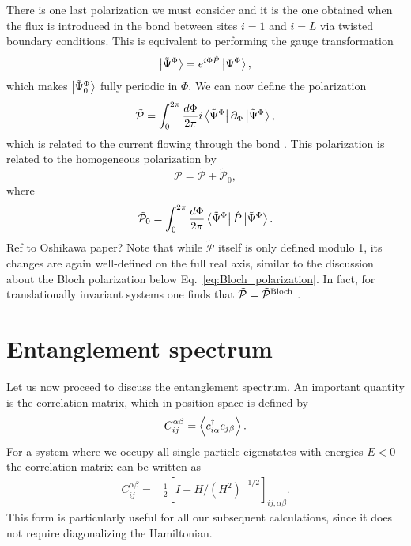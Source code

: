 \documentclass[twocolumn,amsmath,longbibliography,amssymb,superscriptaddress]{revtex4-1}
\newcommand{\maria}[1]{{\color{blue} #1}}
\begin{document}
There is one last polarization we must consider and it is the one obtained when the flux is introduced in the bond between sites $i=1$ and $i=L$ via twisted boundary conditions. This is equivalent to performing the gauge transformation
\begin{align}\label{eq:Psi_tilde}
\ket{\tilde{\Psi}^\Phi}=e^{i\Phi \hat{P}}\ket{\Psi^\Phi},
\end{align}
which makes $\ket{\tilde{\Psi}_0^\Phi}$ fully periodic in $\Phi$. We can now define the polarization
\begin{equation}
\tilde{\mathcal{P}} = \int_0^{2\pi}\frac{d\Phi}{2\pi} i\bra{\tilde{\Psi}^\Phi}\partial_\Phi \ket{\tilde{\Psi}^\Phi},
\label{eq:p_tilde}
\end{equation}
which is related to the current flowing through the bond \cite{Watanabe2018}. This polarization is related to the homogeneous polarization by 
\begin{equation}
\mathcal{P}= \tilde{\mathcal{P}}+\tilde{\mathcal{P}}_0,
\end{equation} 
where
\begin{equation}
\tilde {\mathcal{P}}_0= \int_0^{2\pi}\frac{d\Phi}{2\pi} \bra{\tilde{\Psi}^\Phi}\hat{P}\ket{\tilde{\Psi}^\Phi}.
\end{equation} 
\maria{Ref to Oshikawa paper?}
Note that while $\tilde{\mathcal{P}}$ itself is only defined modulo 1, its changes are again well-defined on the full real axis, similar to the discussion about the Bloch polarization below Eq.~\eqref{eq:Bloch_polarization}. 
In fact, for translationally invariant systems one finds that $\tilde{\mathcal{P}} = \tilde{\mathcal{P}}^{\rm Bloch}$ \cite{Watanabe2018}. 


\section{Entanglement spectrum}
\label{section:ES}
Let us now proceed to discuss the entanglement spectrum. 
An important quantity is the correlation matrix, which in position space is defined by
\begin{align}
C_{ij}^{\alpha \beta} = \expval{c_{i\alpha}^\dagger c_{j\beta}}.
\end{align}
For a system where we occupy all single-particle eigenstates with energies $E<0$ the correlation matrix can be written  as
\begin{align}\label{eq:corr_mat2}
C_{ij}^{\alpha \beta} =& \frac{1}{2}\left[I - H/ (H^2)^{-1/2} \right]_{ij, \alpha \beta}.
\end{align}
This form is particularly useful for all our subsequent calculations, since it does not require diagonalizing the Hamiltonian.
\end{document}
